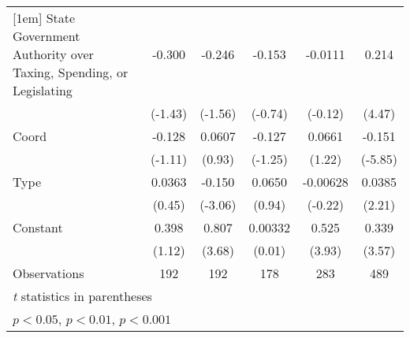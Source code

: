 {\begin{tabular*}{\linewidth}{@{\hskip\tabcolsep\extracolsep\fill}l*{5}{c}}
[1em]
State Government Authority over Taxing, Spending, or Legislating&   -0.300         &   -0.246         &   -0.153         &  -0.0111         &    0.214\sym{***}\\
                &  (-1.43)         &  (-1.56)         &  (-0.74)         &  (-0.12)         &   (4.47)         \\
[1em]
Coord           &   -0.128         &   0.0607         &   -0.127         &   0.0661         &   -0.151\sym{***}\\
                &  (-1.11)         &   (0.93)         &  (-1.25)         &   (1.22)         &  (-5.85)         \\
[1em]
Type            &   0.0363         &   -0.150\sym{**} &   0.0650         & -0.00628         &   0.0385\sym{*}  \\
                &   (0.45)         &  (-3.06)         &   (0.94)         &  (-0.22)         &   (2.21)         \\
[1em]
Constant        &    0.398         &    0.807\sym{***}&  0.00332         &    0.525\sym{***}&    0.339\sym{***}\\
                &   (1.12)         &   (3.68)         &   (0.01)         &   (3.93)         &   (3.57)         \\
\hline
Observations    &      192         &      192         &      178         &      283         &      489         \\
\hline\hline
\multicolumn{6}{l}{\footnotesize \textit{t} statistics in parentheses}\\
\multicolumn{6}{l}{\footnotesize \sym{*} \(p<0.05\), \sym{**} \(p<0.01\), \sym{***} \(p<0.001\)}\\
\end{tabular*}
}
